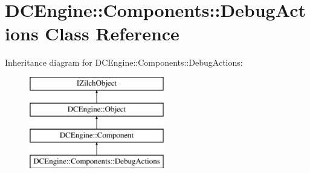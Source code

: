 \hypertarget{classDCEngine_1_1Components_1_1DebugActions}{\section{D\-C\-Engine\-:\-:Components\-:\-:Debug\-Actions Class Reference}
\label{classDCEngine_1_1Components_1_1DebugActions}
}
Inheritance diagram for D\-C\-Engine\-:\-:Components\-:\-:Debug\-Actions\-:\begin{figure}[H]
\begin{center}
\leavevmode
\includegraphics[height=4.000000cm]{classDCEngine_1_1Components_1_1DebugActions}
\end{center}
\end{figure}
